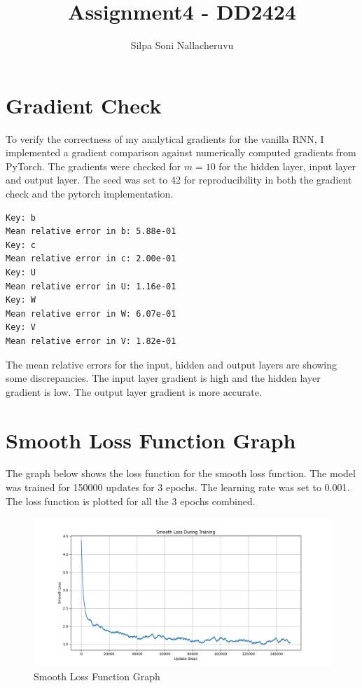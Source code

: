 \documentclass[11pt]{article}
\begin{document}
\title{Assignment4 - DD2424}
\author{Silpa Soni Nallacheruvu}
\date{}
\maketitle

\section*{Gradient Check}

To verify the correctness of my analytical gradients for the vanilla RNN, I implemented a gradient comparison against numerically computed gradients from PyTorch. 
The gradients were checked for \(m = 10 \) for the hidden layer, input layer and output layer. The seed was set to 42 for reproducibility in both the gradient check and the pytorch implementation.

\begin{lstlisting}[caption={Gradient Check}, label={lst:gradient_check}]
Key: b
Mean relative error in b: 5.88e-01
Key: c
Mean relative error in c: 2.00e-01
Key: U
Mean relative error in U: 1.16e-01
Key: W
Mean relative error in W: 6.07e-01
Key: V
Mean relative error in V: 1.82e-01
\end{lstlisting}

The mean relative errors for the input, hidden and output layers are showing some discrepancies. 
The input layer gradient is high and the hidden layer gradient is low. 
The output layer gradient is more accurate. 

\section*{Smooth Loss Function Graph}

The graph below shows the loss function for the smooth loss function. The model was trained for 150000 updates for 3 epochs. The learning rate was set to 0.001.
The loss function is plotted for all the 3 epochs combined.
\begin{figure}[H]
    \centering
    \includegraphics[width=1\textwidth]{smooth_loss_evolution.png}
    \caption{Smooth Loss Function Graph}
\end{figure}
\end{document}

